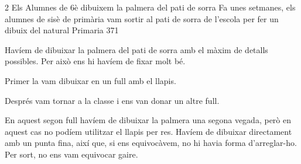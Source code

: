 \newpage
\begin{news}
{2} %
{Els Alumnes de 6è dibuixem la palmera del pati de sorra}
{Fa unes setmanes, els alumnes de sisè de primària vam sortir al pati de sorra de l’escola per fer un dibuix del natural}
{Primaria}
{371}


Havíem de dibuixar la palmera del pati de sorra amb el màxim de detalls possibles. Per això ens hi havíem de fixar molt bé.

Primer la vam dibuixar en un full amb el llapis.

Després vam tornar a la classe i ens van donar un altre full.

En aquest segon full havíem de dibuixar la palmera una segona vegada, però en aquest cas no podíem utilitzar el llapis per res. Havíem de dibuixar directament  amb un punta fina, així que, si ens equivocàvem,  no hi havia forma d’arreglar-ho. Per sort,  no ens vam equivocar gaire.

\end{news}

